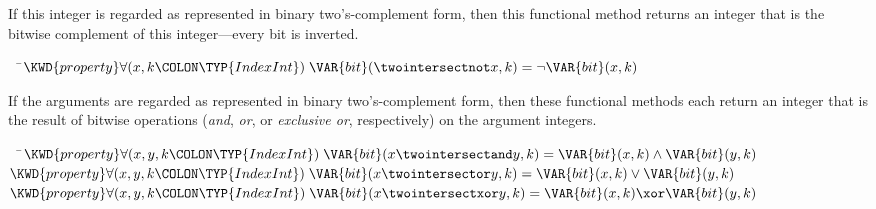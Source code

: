
If this integer is regarded as represented in binary two's-complement form,
then this functional method returns an integer that is the bitwise complement
of this integer---every bit is inverted.

\begin{Fortress}
{\tt~~}\pushtabs\=\+\(  \KWD{property} \forall(x, k\COLON \TYP{IndexInt})\; \VAR{bit}(\twointersectnot x, k) = \neg \VAR{bit}(x, k)\)\-\\\poptabs
\end{Fortress}



If the arguments are regarded as represented in binary two's-complement form,
then these functional methods each return an integer that is the result
of bitwise operations (\emph{and}, \emph{or}, or \emph{exclusive or}, respectively)
on the argument integers.

\begin{Fortress}
{\tt~~}\pushtabs\=\+\(  \KWD{property} \forall(x, y, k\COLON \TYP{IndexInt})\; \VAR{bit}(x \twointersectand y, k) = \VAR{bit}(x, k) \wedge \VAR{bit}(y, k)\)\\
\(  \KWD{property} \forall(x, y, k\COLON \TYP{IndexInt})\; \VAR{bit}(x \twointersector y, k) = \VAR{bit}(x, k) \vee \VAR{bit}(y, k)\)\\
\(  \KWD{property} \forall(x, y, k\COLON \TYP{IndexInt})\; \VAR{bit}(x \twointersectxor y, k) = \VAR{bit}(x, k) \xor \VAR{bit}(y, k)\)\-\\\poptabs
\end{Fortress}



